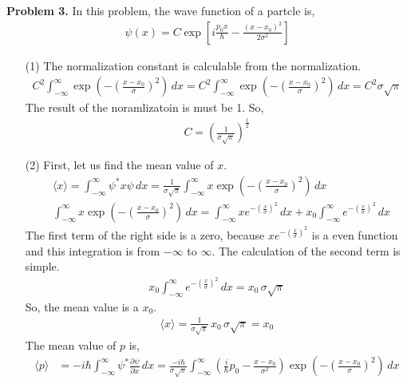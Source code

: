 \documentclass[aps,floatfix,nofootinbib,superscriptaddress,fleqn]{revtex4}
\begin{document}
\noindent \textbf{Problem 3.}
In this problem, the wave function of a partcle is,
\begin{align}
  \psi(x) = C\exp\left[
  i\frac{p_0 x}{\hbar} - \frac{{(x-x_0)}^2}{2\sigma^2} 
  \right]
  \end{align}
  \begin{itemize}
    \item[(1)] The normalization constant is calculable from the normalization.
    \begin{align}
      C^2\int_{-\infty}^{\infty} \exp\left(-{\left(\frac{x-x_0}{\sigma} \right)}^2\right)\,dx 
      = C^2\int_{-\infty}^{\infty}\exp\left(-{\left(\frac{x-x_0}{\sigma} \right)}^2\right)\,dx 
      = C^2\sigma \sqrt{\pi}
    \end{align}
    The result of the noramlizatoin is must be 1. So,
    \begin{align}
      C = {\left(\frac{1}{\sigma \sqrt{\pi}}\right)}^{\frac{1}{2}}
    \end{align}
    \item[(2)]First, let us find the mean value of $x$.
    \begin{align}
      &\langle x \rangle=\int_{-\infty}^{\infty}\psi^*x\psi\,dx 
        = \frac{1}{\sigma\sqrt{\pi}}\int_{-\infty}^{\infty} x \exp\left(-{\left( \frac{x-x_0}{\sigma} \right)}^2\right)\,dx \\
      &\int_{-\infty}^{\infty} x \exp\left(-{\left( \frac{x-x_0}{\sigma} \right)}^2\right)\,dx 
        = \int_{-\infty}^{\infty} x e^{-{\left(\frac{x}{\sigma}\right)}^2}\,dx 
          + x_0\int_{-\infty}^{\infty} e^{-{\left(\frac{x}{\sigma}\right)}^2}\,dx
    \end{align}
    The first term of the right side is a zero, because $x e^{-{\left(\frac{x}{\sigma}\right)}^2}$ is a even function 
    and this integration is from $-\infty$ to $\infty$. The calculation of the second term is simple.
\begin{align}
  x_0\int_{-\infty}^{\infty} e^{-{\left(\frac{x}{\sigma}\right)}^2}\,dx = x_0\,\sigma\sqrt{\pi}
\end{align}
So, the mean value is a $x_0$.
\begin{align}
  \langle x \rangle=\frac{1}{\sigma\sqrt{\pi}}\,x_0\,\sigma\sqrt{\pi} = x_0
\end{align}
The mean value of $p$ is,
\begin{align}
  \langle p \rangle &= -i\hbar \int_{-\infty}^{\infty} \psi^* \frac{\partial \psi}{\partial x}\,dx 
                     = \frac{-i\hbar}{\sigma\sqrt{\pi}}\int_{-\infty}^{\infty} \left(\frac{i}{\hbar}p_0-\frac{x-x_0}{\sigma^2}\right)\exp\left( -{\left(\frac{x-x_0}{\sigma}\right)}^2 \right)\,dx

\end{align}
\end{itemize}
\end{document}
